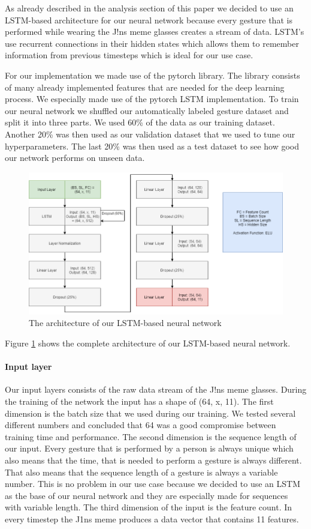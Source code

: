 \documentclass[runningheads]{llncs}
\begin{document}
As already described in the analysis section of this paper we decided to use an LSTM-based architecture for our neural network because every gesture that is performed while wearing the J!ns meme glasses creates a stream of data. LSTM's use recurrent connections in their hidden states which allows them to remember information from previous timesteps which is ideal for our use case.
\par
For our implementation we made use of the pytorch library. The library consists of many already implemented features that are needed for the deep learning process. We especially made use of the pytorch LSTM implementation. To train our neural network we shuffled our automatically labeled gesture dataset and split it into three parts. We used 60\% of the data as our training dataset. Another 20\% was then used as our validation dataset that we used to tune our hyperparameters. The last 20\% was then used as a test dataset to see how good our network performs on unseen data.
\begin{figure}
\centering
\includegraphics[width=\textwidth]{LSTM_Architecture.png}
\caption{The architecture of our LSTM-based neural network}
\label{fig:lstmarchitecture}
\end{figure}
Figure \ref{fig:lstmarchitecture} shows the complete architecture of our LSTM-based neural network.
\paragraph{Input layer}
Our input layers consists of the raw data stream of the J!ns meme glasses. During the training of the network the input has a shape of (64, x, 11). The first dimension is the batch size that we used during our training. We tested several different numbers and concluded that 64 was a good compromise between training time and performance. The second dimension is the sequence length of our input. Every gesture that is performed by a person is always unique which also means that the time, that is needed to perform a gesture is always different. That also means that the sequence length of a gesture is always a variable number. This is no problem in our use case because we decided to use an LSTM as the base of our neural network and they are especially made for sequences with variable length. The third dimension of the input is the feature count. In every timestep the J1ns meme produces a data vector that contains 11 features.
\end{document}
